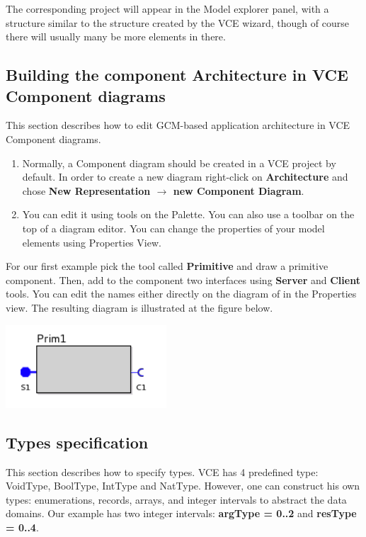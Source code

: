 \documentclass[12pt]{article}
\begin{document}
The corresponding project will appear in the Model explorer panel, with a structure similar to the structure created by the VCE wizard, though of course there will usually many be more elements in there.

\subsection{Building the component Architecture in VCE Component diagrams}\label{sec:comp-diagr}
This section describes how to edit GCM-based application architecture in VCE Component diagrams.
\begin{enumerate}
\item
Normally, a Component diagram should be created in a VCE project by default. In order to create a new diagram right-click on \textbf{Architecture} and chose \textbf{New Representation $\rightarrow$ new Component Diagram}.
\item
You can edit it using tools on the Palette. You can also use a toolbar on the top of a diagram editor. You can change the properties of your model elements using Properties View.
\end{enumerate}

For our first example pick the tool called \textbf{Primitive} and draw a primitive component. Then, add to the component two interfaces using \textbf{Server} and \textbf{Client} tools. You can edit the names either directly on the diagram of in the Properties view. The resulting diagram is illustrated at the figure below.

     \centerline{
     \includegraphics[width=6cm]{draws/prim.png}
     \label{fig:vce-proj}
     }
\subsection{Types specification}
This section describes how to specify types. VCE has 4 predefined type: VoidType, BoolType, IntType and NatType. However, one can construct his own types: enumerations, records, arrays, and integer intervals to abstract the data domains. Our example has two integer intervals: \textbf{argType = 0..2} and \textbf{resType = 0..4}.
\end{document}

